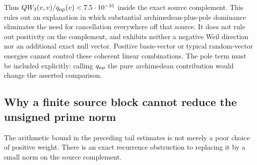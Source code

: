 \documentclass[11pt]{article}
\theoremstyle{remark}
\begin{document}
Thus $QW_3(v,v)/q_{\rm np}(v)<7.5\cdot10^{-31}$ inside the exact
source complement. This rules out an explanation in which substantial
archimedean-plus-pole dominance eliminates the need for cancellation
everywhere off that source. It does not rule out positivity on the
complement, and exhibits neither a negative Weil direction nor an
additional exact null vector. Positive basis-vector or typical
random-vector energies cannot control these coherent linear combinations.
The pole term must be included explicitly: calling $q_{\rm np}$ the
pure archimedean contribution would change the asserted comparison.


\subsection{Why a finite source block cannot reduce the unsigned prime norm}

The arithmetic bound in the preceding tail estimates is not merely a
poor choice of positive weight.  There is an exact recurrence obstruction
to replacing it by a small norm on the source complement.
\end{document}
